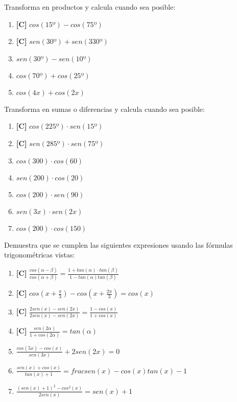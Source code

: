 \Exercicio Transforma en productos y calcula cuando sea posible:

\begin{enumerate}[topsep=0pt]
	\item \textbf{[C]} $cos(15º) - cos(75º)$
	\item \textbf{[C]} $sen(30º) + sen(330º)$
	
	\item $sen(30º) - sen(10º)$
	\item $cos(70º) + cos(25º)$
	\item $cos(4x) + cos(2x)$
\end{enumerate}


\Exercicio Transforma en sumas o diferencias y calcula cuando sea posible:

\begin{enumerate}[topsep=0pt]
	\item \textbf{[C]} $cos(225º) \cdot sen(15º)$
	\item \textbf{[C]} $sen(285º) \cdot sen(75º)$
	\item $cos(300) \cdot cos(60)$
	\item $sen(200) \cdot cos(20)$
	\item $cos(200) \cdot sen(90)$
	\item $sen(3x)\cdot sen(2x)$
	\item $cos(200)\cdot cos(150)$
\end{enumerate}


\Exercicio Demuestra que se cumplen las siguientes expresiones usando las fórmulas trigonométricas vistas:

\begin{enumerate}[topsep=0pt]
	\item \textbf{[C]} $ \frac{cos(\alpha - \beta)}{cos(\alpha + \beta)} = \frac{1 + tan(\alpha) \cdot tan(\beta)}{1-tan(\alpha)tan(\beta)} $
	\item \textbf{[C]} $ cos(x + \frac{\pi}{3}) - cos(x + \frac{2\pi}{3}) = cos(x)$
	\item \textbf{[C]} $ \frac{2 sen(x) - sen(2x)}{2 sen(x) - sen(2x)} = \frac{1 - cos(x)}{1 + cos(x)}$
	\item \textbf{[C]} $ \frac{sen(2\alpha)}{1 + cos(2\alpha)} = tan(\alpha)$
	\item $\frac{cos(5x) - cos(x)}{sen(3x)} + 2 sen(2x) = 0$
	\item $\frac{sen(x)+cos(x)}{tan(x)+1} = frac{sen(x) - cos(x)}{tan(x)-1}$
	\item $\frac{(sen(x)+1)^2-cos^2(x)}{2 sen(x)} = sen(x) + 1$
\end{enumerate}


